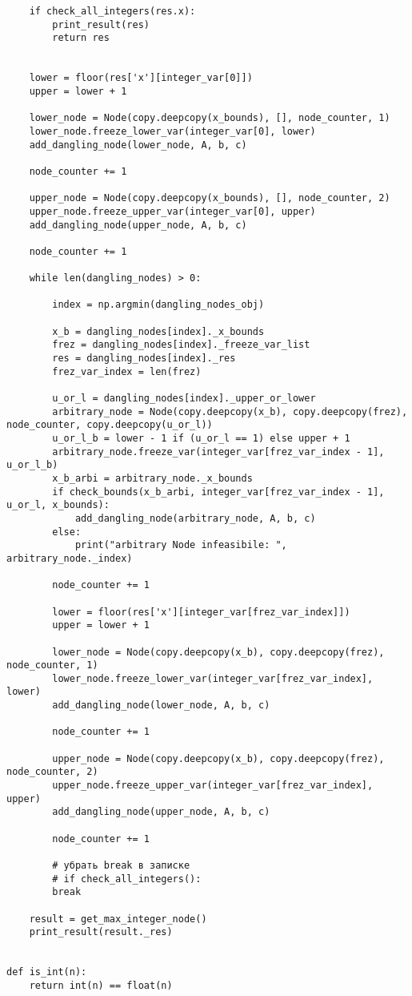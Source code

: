 \documentclass[a4paper, 12pt]{article}   	%
\begin{document}
\begin{verbatim}
	if check_all_integers(res.x):
		print_result(res)
		return res


	lower = floor(res['x'][integer_var[0]])
	upper = lower + 1

	lower_node = Node(copy.deepcopy(x_bounds), [], node_counter, 1)
	lower_node.freeze_lower_var(integer_var[0], lower)
	add_dangling_node(lower_node, A, b, c)

	node_counter += 1

	upper_node = Node(copy.deepcopy(x_bounds), [], node_counter, 2)
	upper_node.freeze_upper_var(integer_var[0], upper)
	add_dangling_node(upper_node, A, b, c)

	node_counter += 1

	while len(dangling_nodes) > 0:

		index = np.argmin(dangling_nodes_obj)

		x_b = dangling_nodes[index]._x_bounds
		frez = dangling_nodes[index]._freeze_var_list
		res = dangling_nodes[index]._res
		frez_var_index = len(frez)

		u_or_l = dangling_nodes[index]._upper_or_lower
		arbitrary_node = Node(copy.deepcopy(x_b), copy.deepcopy(frez), node_counter, copy.deepcopy(u_or_l))
		u_or_l_b = lower - 1 if (u_or_l == 1) else upper + 1
		arbitrary_node.freeze_var(integer_var[frez_var_index - 1], u_or_l_b)
		x_b_arbi = arbitrary_node._x_bounds
		if check_bounds(x_b_arbi, integer_var[frez_var_index - 1], u_or_l, x_bounds):
			add_dangling_node(arbitrary_node, A, b, c)
		else:
			print("arbitrary Node infeasibile: ", arbitrary_node._index)

		node_counter += 1

		lower = floor(res['x'][integer_var[frez_var_index]])
		upper = lower + 1

		lower_node = Node(copy.deepcopy(x_b), copy.deepcopy(frez), node_counter, 1)
		lower_node.freeze_lower_var(integer_var[frez_var_index], lower)
		add_dangling_node(lower_node, A, b, c)

		node_counter += 1

		upper_node = Node(copy.deepcopy(x_b), copy.deepcopy(frez), node_counter, 2)
		upper_node.freeze_upper_var(integer_var[frez_var_index], upper)
		add_dangling_node(upper_node, A, b, c)

		node_counter += 1

		# убрать break в записке
		# if check_all_integers():
		break

	result = get_max_integer_node()
	print_result(result._res)


def is_int(n):
	return int(n) == float(n)



\end{verbatim}
\end{document}
